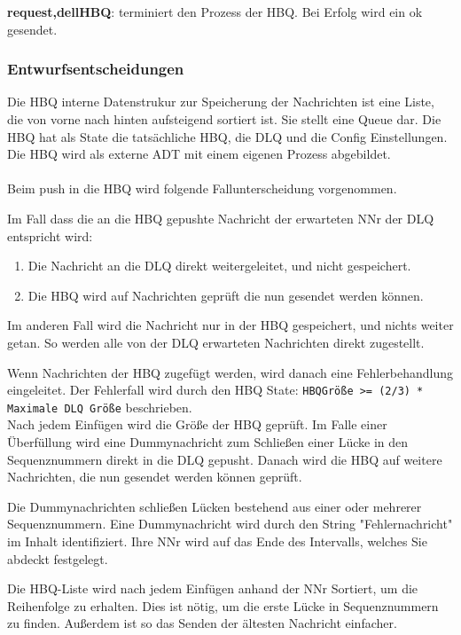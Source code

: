 \documentclass{article}
\begin{document}
\textbf{{request,dellHBQ}}: terminiert den Prozess der HBQ. Bei Erfolg wird ein ok gesendet.\\

\subsubsection{Entwurfsentscheidungen}
Die HBQ interne Datenstrukur zur Speicherung der Nachrichten ist eine Liste, die von vorne nach hinten aufsteigend
sortiert ist. Sie stellt eine Queue dar. Die HBQ hat als State die tatsächliche HBQ, die DLQ und die Config
Einstellungen. Die HBQ wird als externe ADT mit einem eigenen Prozess abgebildet.\\
\\
Beim push in die HBQ wird folgende Fallunterscheidung vorgenommen.

Im Fall dass die an die HBQ gepushte Nachricht der erwarteten NNr der DLQ entspricht wird:
	\begin{enumerate}
		\item{Die Nachricht an die DLQ direkt weitergeleitet, und nicht gespeichert.}
		\item{Die HBQ wird auf Nachrichten geprüft die nun gesendet werden können.}
	\end{enumerate}

Im anderen Fall wird die Nachricht nur in der HBQ gespeichert, und nichts weiter getan.
So werden alle von der DLQ erwarteten Nachrichten direkt zugestellt. 

Wenn Nachrichten der HBQ zugefügt werden, wird danach eine Fehlerbehandlung eingeleitet. Der Fehlerfall wird durch den
HBQ State: \texttt{HBQGröße >= (2/3) * Maximale DLQ Größe} beschrieben.\\

Nach jedem Einfügen wird die Größe der HBQ geprüft. Im Falle einer Überfüllung
wird eine Dummynachricht zum Schließen einer Lücke in den Sequenznummern direkt in 
die DLQ gepusht. Danach wird die HBQ auf weitere Nachrichten, die nun gesendet werden können geprüft.

Die Dummynachrichten schließen Lücken bestehend aus einer oder mehrerer Sequenznummern. Eine Dummynachricht wird durch
den String "Fehlernachricht" im Inhalt identifiziert. Ihre NNr wird auf das Ende des Intervalls, welches Sie abdeckt
festgelegt.

Die HBQ-Liste wird nach jedem Einfügen anhand der NNr Sortiert, um die Reihenfolge zu erhalten.
Dies ist nötig, um die erste Lücke in Sequenznummern zu finden. Außerdem ist so das Senden der
ältesten Nachricht einfacher.
\end{document}
